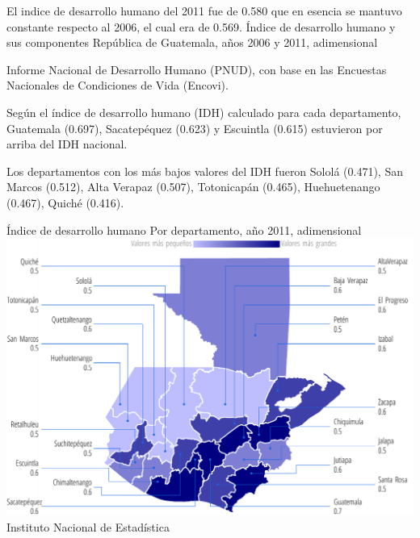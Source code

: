  
 {%
 El indice de desarrollo humano del 2011 fue de 0.580 que en esencia se mantuvo constante respecto al 2006, el cual era de 0.569. }%
 {%
 	Índice de desarrollo humano y sus componentes} %
 {%
 	República de Guatemala, años 2006 y 2011, adimensional} %
 {%
 	\begin{tikzpicture}[x=1pt,y=1pt]    \end{tikzpicture}}%
 {%
 	Informe Nacional de Desarrollo Humano (PNUD), con base en las Encuestas Nacionales de Condiciones de Vida (Encovi).} %
   
   
   
   
   	{%
 Según el índice de desarrollo humano (IDH) calculado para cada departamento, Guatemala (0.697), Sacatepéquez (0.623) y Escuintla (0.615) estuvieron por arriba del IDH nacional.
 
 Los departamentos con los más bajos valores del IDH fueron Sololá (0.471), San Marcos (0.512), Alta Verapaz (0.507), Totonicapán (0.465), Huehuetenango (0.467),  Quiché (0.416).}%
   	{%
   		Índice de desarrollo humano
   	}%
   	{%
   	Por departamento, año 2011, adimensional} %
   	{%
   		\includegraphics[width=52\cuadri]{graficas/1_11.pdf}}%
   	{%
   		Instituto Nacional de Estadística} %
 

